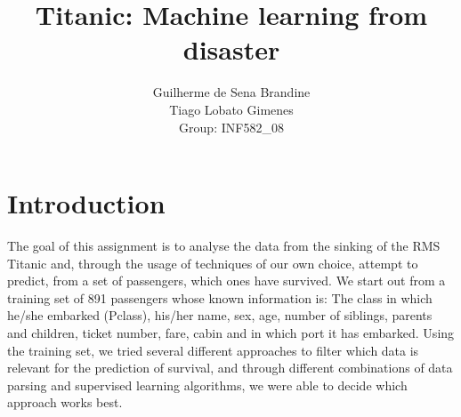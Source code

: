 \documentclass[12pt,a4paper]{article}
\author{Guilherme de Sena Brandine \\ Tiago Lobato Gimenes \\ Group: INF582\_08}
\title{Titanic: Machine learning from disaster}
\begin{document}
\maketitle

\section*{Introduction}
The goal of this assignment is to analyse the data from the sinking of the RMS Titanic and, through the usage of techniques of our own choice, attempt to predict, from a set of passengers, which ones have survived. We start out from a training set of 891 passengers whose known information is: The class in which he/she embarked (Pclass), his/her name, sex, age, number of siblings, parents and children, ticket number, fare, cabin and in which port it has embarked. Using the training set, we tried several different approaches to filter which data is relevant for the prediction of survival, and through different combinations of data parsing and supervised learning algorithms, we were able to decide which approach works best.
\end{document}
